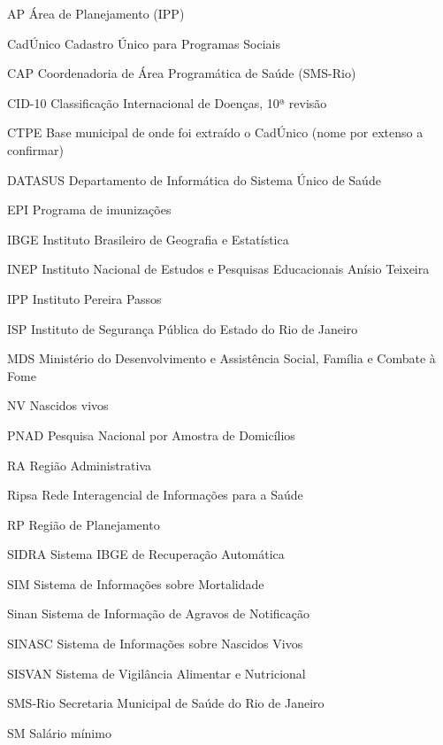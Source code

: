 \begin{siglas}
  \item[AP] Área de Planejamento (IPP)
  \item[CadÚnico] Cadastro Único para Programas Sociais
  \item[CAP] Coordenadoria de Área Programática de Saúde (SMS-Rio)
  \item[CID-10] Classificação Internacional de Doenças, 10ª revisão
  \item[CTPE] Base municipal de onde foi extraído o CadÚnico (nome por extenso a confirmar)
  \item[DATASUS] Departamento de Informática do Sistema Único de Saúde
  \item[EPI] Programa de imunizações
  \item[IBGE] Instituto Brasileiro de Geografia e Estatística
  \item[INEP] Instituto Nacional de Estudos e Pesquisas Educacionais Anísio Teixeira
  \item[IPP] Instituto Pereira Passos
  \item[ISP] Instituto de Segurança Pública do Estado do Rio de Janeiro
  \item[MDS] Ministério do Desenvolvimento e Assistência Social, Família e Combate à Fome
  \item[NV] Nascidos vivos
  \item[PNAD] Pesquisa Nacional por Amostra de Domicílios
  \item[RA] Região Administrativa
  \item[Ripsa] Rede Interagencial de Informações para a Saúde
  \item[RP] Região de Planejamento
  \item[SIDRA] Sistema IBGE de Recuperação Automática
  \item[SIM] Sistema de Informações sobre Mortalidade
  \item[Sinan] Sistema de Informação de Agravos de Notificação
  \item[SINASC] Sistema de Informações sobre Nascidos Vivos
  \item[SISVAN] Sistema de Vigilância Alimentar e Nutricional
  \item[SMS-Rio] Secretaria Municipal de Saúde do Rio de Janeiro
  \item[SM] Salário mínimo
\end{siglas}
